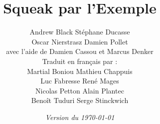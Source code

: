 \documentclass[a4paper,10pt,twoside]{book}
\begin{document}
\frontmatter
\setcounter{page}{1}
\pagestyle{headings}
\author{
	Andrew Black\quad
	St\'ephane Ducasse\\[1ex]
	Oscar Nierstrasz\quad
	Damien Pollet
	\\[4ex]
	avec l'aide de Damien Cassou et Marcus Denker
	\\[4ex]
Traduit en fran\c{c}ais par :\\[2ex]
		Martial Boniou\quad
		Mathieu Chappuis\\[1ex]
		Luc Fabresse\quad
		Ren\'e Mages\\[1ex]
		Nicolas Petton\quad
		Alain Plantec\\[1ex]
		Beno\^it Tuduri\quad
		Serge Stinckwich\\[1ex]
	}
\title{\Huge\bf Squeak par l'Exemple}
\isodate
\date{\emph{Version du \today}}
\maketitle
~ %
\vfill
\end{document}
